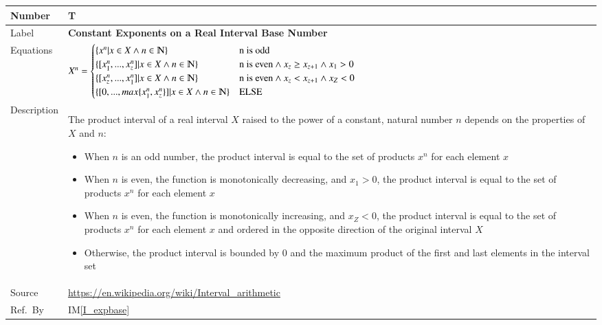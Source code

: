 \documentclass[12pt]{article}
\newcommand{\colAwidth}{0.13\textwidth}
\newcommand{\colBwidth}{0.82\textwidth}
\newcounter{theorynum} %
\newcommand{\iref}[1]{IM\ref{#1}}
\begin{document}
\noindent
\begin{minipage}{\textwidth}
	\renewcommand*{\arraystretch}{1.5}
	\begin{tabular}{| p{\colAwidth} | p{\colBwidth}|}
		\hline
		\rowcolor[gray]{0.9}
		Number& T{theorynum}\thetheorynum 
		\label{T_expbase}\\
		\hline
		Label&\bf Constant Exponents on a Real Interval Base 
		Number\\
		\hline
		Equations &  $X^n = \begin{cases}
			\{x^n | x \in X \wedge n 
			\in \varmathbb{N}\} & \text{n is odd}\\
			\{[x_{1}^n,...,x_{z}^n] | x \in X \wedge n 
			\in \varmathbb{N}\} & \text{n is even}\wedge x_{z} \geq x_{z+1} 
			\wedge x_{1} > 0\\
			\{[x_{z}^n,...,x_{1}^n] | x \in X \wedge n 
			\in \varmathbb{N}\} & \text{n is even} \wedge x_{z} < x_{z+1} 
			\wedge x_{Z} < 0\\
			\{[0,...,max\{x_{1}^n,x_{z}^n\}] | x \in X \wedge n 
			\in \varmathbb{N}\} & \text{ELSE}\\
		\end{cases}$
		\newline
		\\
		\hline
		Description & The product interval of a real interval $X$ 
		raised to the power of a constant, natural number $n$ depends on the 
		properties of $X$ and $n$:
		\begin{itemize}
			\item When $n$ is an odd number, the product interval is equal to 
			the set of products $x^n$ for each element $x$
			\item When $n$ is even, the function is monotonically decreasing, 
			and $x_{1} > 0$, the product interval is equal to the set of 
			products $x^n$ for each element $x$
			\item When $n$ is even, the function is monotonically increasing, 
			and $x_{Z} < 0$, the product interval is equal to the set of 
			products $x^n$ for each element $x$ and ordered in the opposite 
			direction of the original interval $X$
			\item Otherwise, the product interval is bounded by $0$ and the 
			maximum product of the first and last elements in the interval set
		\end{itemize}\\
		\hline
		Source & \url{https://en.wikipedia.org/wiki/Interval_arithmetic}\\
		\hline
		Ref.\ By & \iref{I_expbase}\\
		\hline
	\end{tabular}
\end{minipage}\\
\end{document}
